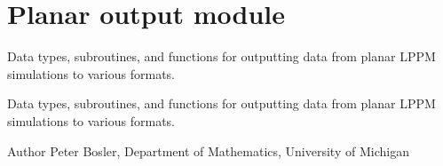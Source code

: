 \hypertarget{group___plane_output}{\section{Planar output module}
\label{group___plane_output}
}


Data types, subroutines, and functions for outputting data from planar L\+P\+P\+M simulations to various formats.  


Data types, subroutines, and functions for outputting data from planar L\+P\+P\+M simulations to various formats. 

\begin{DoxyAuthor}{Author}
Peter Bosler, Department of Mathematics, University of Michigan 
\end{DoxyAuthor}
